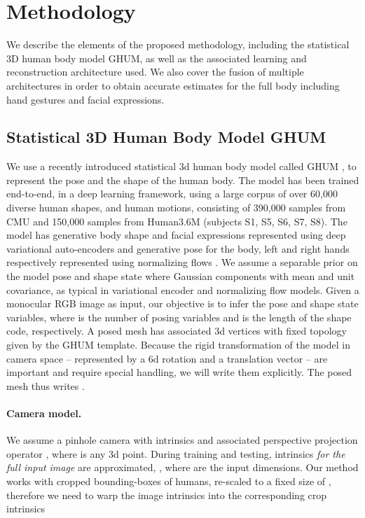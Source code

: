 \documentclass[final]{cvpr}
\begin{document}
\section{Methodology}\label{sec:methodology}

We describe the elements of the proposed methodology, including the statistical 3D human body model GHUM, as well as the associated learning and reconstruction architecture used. We also cover the fusion of multiple architectures in order to obtain accurate estimates for the full body including hand gestures and facial expressions.

\subsection{Statistical 3D Human Body Model GHUM}
We use a recently introduced statistical 3d human body model called GHUM \cite{ghum2020}, to represent the pose and the shape of the human body. The model has been trained end-to-end, in a deep learning framework, using a large corpus of over 60,000 diverse human shapes, and  human motions, consisting of 390,000 samples from CMU and 150,000 samples from Human3.6M (subjects S1, S5, S6, S7, S8). 
The model has generative body shape and facial expressions  represented using deep variational auto-encoders and generative pose  for the body, left and right hands respectively represented using normalizing flows \cite{zanfir2020weakly}. We assume a separable prior on the model pose and shape state  where Gaussian components with  mean and unit  covariance, as typical in variational encoder and normalizing flow models. 
Given a monocular RGB image as input, our objective is to infer the pose  and shape  state variables, where  is the number of posing variables and  is the length of the shape code, respectively. A posed mesh  has  associated 3d vertices  with fixed topology given by the GHUM template. Because the rigid transformation of the model in camera space -- represented by a 6d rotation \cite{zhou2018continuity}  and a translation vector  -- are important and require special handling, we will write them explicitly. The posed mesh thus writes .

\paragraph{Camera model.} We assume a pinhole camera with intrinsics  and associated perspective projection operator , where  is any 3d point. During training and testing, intrinsics \textit{for the full input image} are approximated, , where  are the input dimensions. Our method works with cropped bounding-boxes of humans, re-scaled to a fixed size 
of ,
therefore we need to warp the image intrinsics  into the corresponding crop intrinsics 
\end{document}
